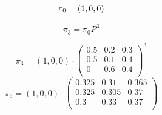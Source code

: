 \documentclass{templateNote}
\begin{document}
\begin{enumerate}
\begin{enumerate}[label=\alph*)]
        
        \begin{equation*}
            \pi_0 = (1,0,0)\\
        \end{equation*}

        \begin{equation*}
            \pi_3 = \pi_0 P^3
        \end{equation*}

        \begin{equation*}
            \pi_3 = (1,0,0)
            \cdot
            \begin{pmatrix}
                0.5 & 0.2 & 0.3\\
                0.5 & 0.1 & 0.4\\
                0   & 0.6 & 0.4\\
            \end{pmatrix}^3
        \end{equation*}
        \begin{equation*}
            \pi_3 = (1,0,0)
            \cdot
            \begin{pmatrix}
                0.325 & 0.31 & 0.365\\
                0.325 & 0.305 & 0.37\\
                0.3  & 0.33 & 0.37\\
            \end{pmatrix}
        \end{equation*}


\end{enumerate}
\end{enumerate}
\end{document}
